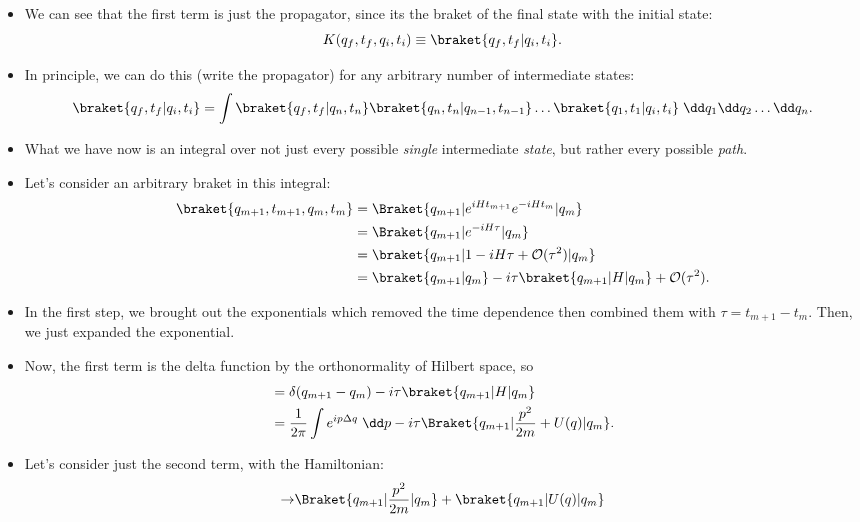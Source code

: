 \begin{itemize}
    \item We can see that the first term is just the propagator, since its the braket of the final state with the initial state:
        \begin{equation}
            K(q_f,t_f,q_i,t_i) \equiv \braket{q_f,t_f | q_i,t_i}.
        \end{equation}
    \item In principle, we can do this (write the propagator) for any arbitrary number of intermediate states:
        \begin{equation}
            \braket{q_f,t_f | q_i,t_i} = \int \braket{q_f,t_f | q_n,t_n}\braket{q_n,t_n | q_{n-1},t_{n-1}} \ldots \braket{q_1,t_1 | q_i,t_i} \;\dd q_1 \dd q_2 \ldots \dd q_n.
        \end{equation}
    \item What we have now is an integral over not just every possible \textit{single} intermediate \textit{state}, but rather every possible \textit{path}.
    \item Let's consider an arbitrary braket in this integral:
        \begin{align}
            \braket{q_{m+1},t_{m+1},q_m,t_m} &= \Braket{q_{m+1}| e^{iHt_{m+1}} e^{-iHt_m} | q_{m}} \\
            &= \Braket{q_{m+1} | e^{-iH\tau} | q_m} \\
            &= \braket{q_{m+1} | 1 - iH\tau + \mathcal{O}(\tau^2) | q_m} \\
            &= \braket{q_{m+1} | q_m} - i\tau \braket{q_{m+1} | H | q_m} + \mathcal{O}(\tau^2).
        \end{align}
    \item In the first step, we brought out the exponentials which removed the time dependence then combined them with $\tau = t_{m+1} - t_m$. Then, we just expanded the exponential.
    \item Now, the first term is the delta function by the orthonormality of Hilbert space, so
        \begin{align}
            &= \delta(q_{m+1} - q_m) - i\tau\braket{q_{m+1} | H | q_m} \\
            &= \frac{1}{2\pi}\int e^{ip\Delta q} \;\dd p - i\tau\Braket{q_{m+1} | \frac{p^2}{2m} + U(q) | q_m}.
        \end{align}
    \item Let's consider just the second term, with the Hamiltonian:
        \begin{align}
            \rightarrow &\Braket{q_{m+1} | \frac{p^2}{2m} | q_m} + \braket{q_{m+1} | U(q) | q_m} \\

\end{align}
\end{itemize}
